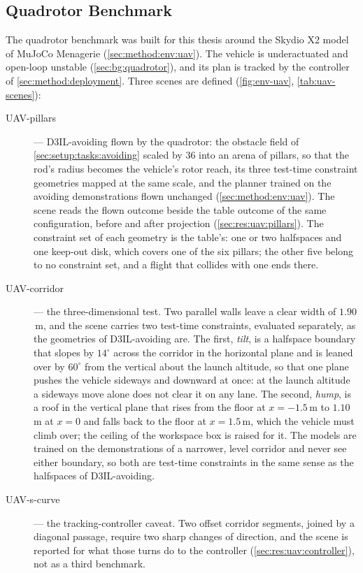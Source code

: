 \FloatBarrier

\subsection{Quadrotor Benchmark}\label{sec:setup:tasks:uav}

The quadrotor benchmark was built for this thesis around the Skydio X2 model of MuJoCo Menagerie
\parencite{zakka2022menagerie} (\autoref{sec:method:env:uav}). The vehicle is underactuated and open-loop
unstable (\autoref{sec:bg:quadrotor}), and its plan is tracked by the controller of
\autoref{sec:method:deployment}. Three scenes are defined
(\autoref{fig:env-uav}, \autoref{tab:uav-scenes}):

\begin{description}
  \item[UAV-pillars] --- D3IL-avoiding flown by the quadrotor: the obstacle field of
    \autoref{sec:setup:tasks:avoiding} scaled by $36$ into an arena of pillars, so that the rod's radius becomes
    the vehicle's rotor reach, its three test-time constraint geometries mapped at the same scale, and the
    planner trained on the avoiding demonstrations flown unchanged (\autoref{sec:method:env:uav}). The scene
    reads the flown outcome beside the table outcome of the same configuration, before and after projection
    (\autoref{sec:res:uav:pillars}). The constraint set of each geometry is the table's: one or two halfspaces
    and one keep-out disk, which covers one of the six pillars; the other five belong to no constraint set,
    and a flight that collides with one ends there.
  \item[UAV-corridor] --- the three-dimensional test. Two parallel walls leave a clear width of
    $1.90$\,m, and the scene carries two test-time constraints, evaluated separately, as the geometries
    of D3IL-avoiding are. The first, \emph{tilt}, is a halfspace boundary that slopes by $14^\circ$
    across the corridor in the horizontal plane and is leaned over by $60^\circ$ from the vertical about
    the launch altitude, so that one plane pushes the vehicle sideways and downward at once: at the
    launch altitude a sideways move alone does not clear it on any lane. The second, \emph{hump}, is a
    roof in the vertical plane that rises from the floor at $x=-1.5$\,m to $1.10$\,m at $x=0$ and falls
    back to the floor at $x=1.5$\,m, which the vehicle must climb over; the ceiling of the workspace box
    is raised for it. The models are trained on the demonstrations of a narrower, level corridor and
    never see either boundary, so both are test-time constraints in the same sense as the halfspaces of
    D3IL-avoiding.
  \item[UAV-s-curve] --- the tracking-controller caveat. Two offset corridor segments, joined by a
    diagonal passage, require two sharp changes of direction, and the scene is reported for what those
    turns do to the controller (\autoref{sec:res:uav:controller}), not as a third benchmark.
\end{description}

